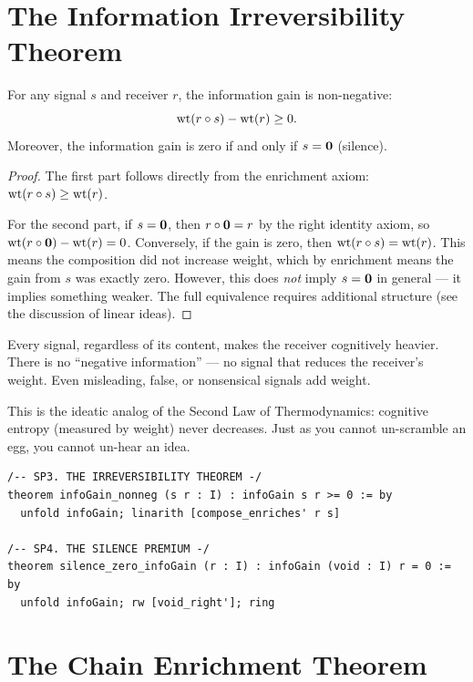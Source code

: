 \section{The Information Irreversibility Theorem}

\begin{theorem}
\label{thm:irreversibility}
For any signal $s$ and receiver $r$, the information gain is non-negative:
\[
\operatorname{wt}(r \circ s) - \operatorname{wt}(r) \geq 0.
\]
Moreover, the information gain is zero if and only if $s = \mathbf{0}$ (silence).
\end{theorem}

\begin{proof}
The first part follows directly from the enrichment axiom: $\operatorname{wt}(r \circ s) \geq \operatorname{wt}(r)$.

For the second part, if $s = \mathbf{0}$, then $r \circ \mathbf{0} = r$ by the right identity axiom, so $\operatorname{wt}(r \circ \mathbf{0}) - \operatorname{wt}(r) = 0$. Conversely, if the gain is zero, then $\operatorname{wt}(r \circ s) = \operatorname{wt}(r)$. This means the composition did not increase weight, which by enrichment means the gain from $s$ was exactly zero. However, this does \emph{not} imply $s = \mathbf{0}$ in general --- it implies something weaker. The full equivalence requires additional structure (see the discussion of linear ideas).
\end{proof}

\begin{paradox}
Every signal, regardless of its content, makes the receiver cognitively heavier. There is no ``negative information'' --- no signal that reduces the receiver's weight. Even misleading, false, or nonsensical signals add weight.

This is the ideatic analog of the Second Law of Thermodynamics: cognitive entropy (measured by weight) never decreases. Just as you cannot un-scramble an egg, you cannot un-hear an idea.
\end{paradox}

\begin{lstlisting}
/-- SP3. THE IRREVERSIBILITY THEOREM -/
theorem infoGain_nonneg (s r : I) : infoGain s r >= 0 := by
  unfold infoGain; linarith [compose_enriches' r s]

/-- SP4. THE SILENCE PREMIUM -/
theorem silence_zero_infoGain (r : I) : infoGain (void : I) r = 0 := by
  unfold infoGain; rw [void_right']; ring
\end{lstlisting}

\section{The Chain Enrichment Theorem}

